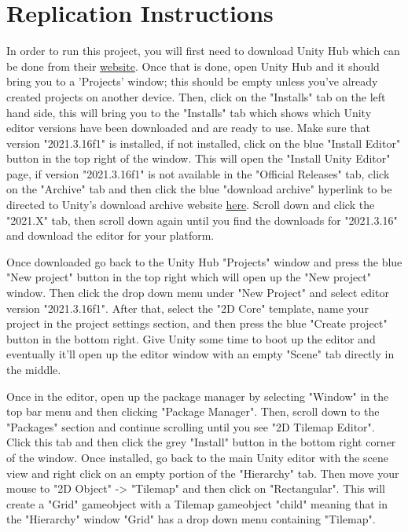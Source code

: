 \documentclass[10pt,twocolumn]{article}
\begin{document}
\appendix

\section{Replication Instructions}

In order to run this project, you will first need to download Unity Hub which can be done from their \href{https://unity.com/download}{website}. Once that is done, open Unity Hub and it should bring you to a 'Projects' window; this should be empty unless you've already created projects on another device. Then, click on the "Installs" tab on the left hand side, this will bring you to the "Installs" tab which shows which Unity editor versions have been downloaded and are ready to use. Make sure that version "2021.3.16f1" is installed, if not installed, click on the blue "Install Editor" button in the top right of the window. This will open the "Install Unity Editor" page, if version "2021.3.16f1" is not available in the "Official Releases" tab, click on the "Archive" tab and then click the blue "download archive" hyperlink to be directed to Unity's download archive website \href{https://unity.com/releases/editor/archive}{here}. Scroll down and click the "2021.X" tab, then scroll down again until you find the downloads for "2021.3.16" and download the editor for your platform. 

Once downloaded go back to the Unity Hub "Projects" window and press the blue "New project" button in the top right which will open up the "New project" window. Then click the drop down menu under "New Project" and select editor version "2021.3.16f1". After that, select the "2D Core" template, name your project in the project settings section, and then press the blue "Create project" button in the bottom right. Give Unity some time to boot up the editor and eventually it'll open up the editor window with an empty "Scene" tab directly in the middle. 

Once in the editor, open up the package manager by selecting "Window" in the top bar menu and then clicking "Package Manager". Then, scroll down to the "Packages" section and continue scrolling until you see "2D Tilemap Editor". Click this tab and then click the grey "Install" button in the bottom right corner of the window. Once installed, go back to the main Unity editor with the scene view and right click on an empty portion of the "Hierarchy" tab. Then move your mouse to "2D Object" -> "Tilemap" and then click on "Rectangular". This will create a "Grid" gameobject with a Tilemap gameobject "child" meaning that in the "Hierarchy" window "Grid" has a drop down menu containing "Tilemap".
\end{document}
